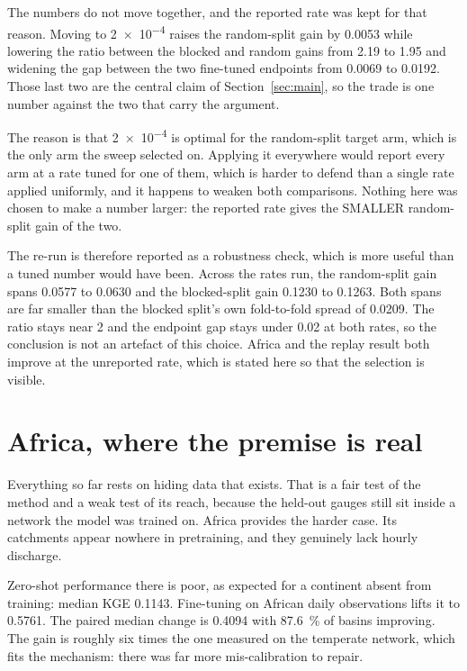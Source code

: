 \documentclass[11pt,a4paper]{article}
\begin{document}
The numbers do not move together, and the reported rate was kept for that reason. Moving to \num{2e-4} raises the random-split gain by \num{0.0053} while lowering the ratio between the blocked and random gains from \num{2.19} to \num{1.95} and widening the gap between the two fine-tuned endpoints from \num{0.0069} to \num{0.0192}. Those last two are the central claim of Section~\ref{sec:main}, so the trade is one number against the two that carry the argument.

The reason is that \num{2e-4} is optimal for the random-split target arm, which is the only arm the sweep selected on. Applying it everywhere would report every arm at a rate tuned for one of them, which is harder to defend than a single rate applied uniformly, and it happens to weaken both comparisons. Nothing here was chosen to make a number larger: the reported rate gives the SMALLER random-split gain of the two.

The re-run is therefore reported as a robustness check, which is more useful than a tuned number would have been. Across the rates run, the random-split gain spans \num{+0.0577} to \num{+0.0630} and the blocked-split gain \num{+0.1230} to \num{+0.1263}. Both spans are far smaller than the blocked split's own fold-to-fold spread of \num{0.0209}. The ratio stays near \num{2} and the endpoint gap stays under \num{0.02} at both rates, so the conclusion is not an artefact of this choice. Africa and the replay result both improve at the unreported rate, which is stated here so that the selection is visible.


\section{Africa, where the premise is real}\label{sec:africa}
Everything so far rests on hiding data that exists. That is a fair test of the method and a weak test of its reach, because the held-out gauges still sit inside a network the model was trained on. Africa provides the harder case. Its catchments appear nowhere in pretraining, and they genuinely lack hourly discharge.

Zero-shot performance there is poor, as expected for a continent absent from training: median KGE \num{0.1143}. Fine-tuning on African daily observations lifts it to \num{0.5761}. The paired median change is \num{+0.4094} with \SI{87.6}{\percent} of basins improving. The gain is roughly six times the one measured on the temperate network, which fits the mechanism: there was far more mis-calibration to repair.
\end{document}
